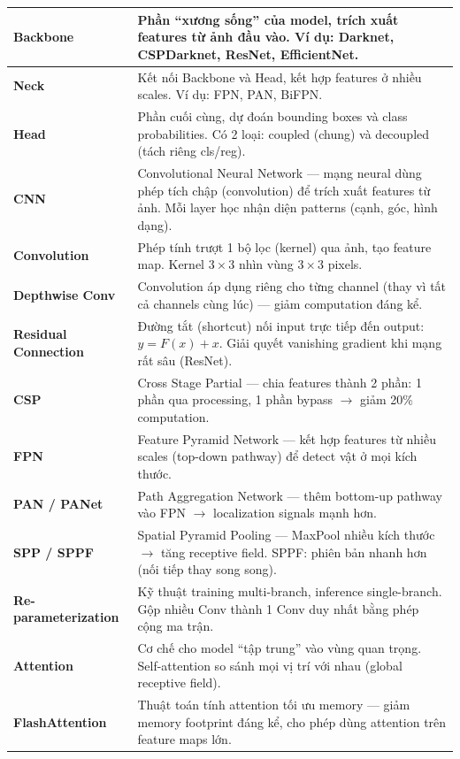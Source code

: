 \documentclass[12pt,a4paper]{report}
\begin{document}
\begin{longtable}{p{3.5cm}p{12cm}}
\textbf{Backbone} & Phần ``xương sống'' của model, trích xuất features từ ảnh đầu vào. Ví dụ: Darknet, CSPDarknet, ResNet, EfficientNet. \\
\midrule
\textbf{Neck} & Kết nối Backbone và Head, kết hợp features ở nhiều scales. Ví dụ: FPN, PAN, BiFPN. \\
\midrule
\textbf{Head} & Phần cuối cùng, dự đoán bounding boxes và class probabilities. Có 2 loại: coupled (chung) và decoupled (tách riêng cls/reg). \\
\midrule
\textbf{CNN} & Convolutional Neural Network --- mạng neural dùng phép tích chập (convolution) để trích xuất features từ ảnh. Mỗi layer học nhận diện patterns (cạnh, góc, hình dạng). \\
\midrule
\textbf{Convolution} & Phép tính trượt 1 bộ lọc (kernel) qua ảnh, tạo feature map. Kernel $3\times3$ nhìn vùng $3\times3$ pixels. \\
\midrule
\textbf{Depthwise Conv} & Convolution áp dụng riêng cho từng channel (thay vì tất cả channels cùng lúc) --- giảm computation đáng kể. \\
\midrule
\textbf{Residual Connection} & Đường tắt (shortcut) nối input trực tiếp đến output: $y = F(x) + x$. Giải quyết vanishing gradient khi mạng rất sâu (ResNet). \\
\midrule
\textbf{CSP} & Cross Stage Partial --- chia features thành 2 phần: 1 phần qua processing, 1 phần bypass $\rightarrow$ giảm 20\% computation. \\
\midrule
\textbf{FPN} & Feature Pyramid Network --- kết hợp features từ nhiều scales (top-down pathway) để detect vật ở mọi kích thước. \\
\midrule
\textbf{PAN / PANet} & Path Aggregation Network --- thêm bottom-up pathway vào FPN $\rightarrow$ localization signals mạnh hơn. \\
\midrule
\textbf{SPP / SPPF} & Spatial Pyramid Pooling --- MaxPool nhiều kích thước $\rightarrow$ tăng receptive field. SPPF: phiên bản nhanh hơn (nối tiếp thay song song). \\
\midrule
\textbf{Re-parameterization} & Kỹ thuật training multi-branch, inference single-branch. Gộp nhiều Conv thành 1 Conv duy nhất bằng phép cộng ma trận. \\
\midrule
\textbf{Attention} & Cơ chế cho model ``tập trung'' vào vùng quan trọng. Self-attention so sánh mọi vị trí với nhau (global receptive field). \\
\midrule
\textbf{FlashAttention} & Thuật toán tính attention tối ưu memory --- giảm memory footprint đáng kể, cho phép dùng attention trên feature maps lớn. \\
\bottomrule
\end{longtable}
\end{document}
